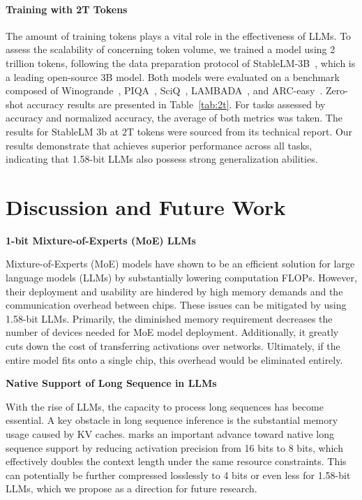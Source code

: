 \paragraph{Training with 2T Tokens}

The amount of training tokens plays a vital role in the effectiveness of LLMs. To assess the scalability of  concerning token volume, we trained a  model using 2 trillion tokens, following the data preparation protocol of StableLM-3B~\cite{StableLM-3B-4E1T}, which is a leading open-source 3B model. Both models were evaluated on a benchmark composed of Winogrande~\cite{winoGrande}, PIQA~\cite{piqa}, SciQ~\cite{sciq}, LAMBADA~\cite{lambada}, and ARC-easy~\cite{arc}. Zero-shot accuracy results are presented in Table~\ref{tab:2t}. For tasks assessed by accuracy and normalized accuracy, the average of both metrics was taken. The results for StableLM 3b at 2T tokens were sourced from its technical report. Our results demonstrate that  achieves superior performance across all tasks, indicating that 1.58-bit LLMs also possess strong generalization abilities.

\section{Discussion and Future Work}

\textbf{1-bit Mixture-of-Experts (MoE) LLMs}

Mixture-of-Experts (MoE) models have shown to be an efficient solution for large language models (LLMs) by substantially lowering computation FLOPs. However, their deployment and usability are hindered by high memory demands and the communication overhead between chips. These issues can be mitigated by using 1.58-bit LLMs. Primarily, the diminished memory requirement decreases the number of devices needed for MoE model deployment. Additionally, it greatly cuts down the cost of transferring activations over networks. Ultimately, if the entire model fits onto a single chip, this overhead would be eliminated entirely.

\textbf{Native Support of Long Sequence in LLMs}

With the rise of LLMs, the capacity to process long sequences has become essential. A key obstacle in long sequence inference is the substantial memory usage caused by KV caches.  marks an important advance toward native long sequence support by reducing activation precision from 16 bits to 8 bits, which effectively doubles the context length under the same resource constraints. This can potentially be further compressed losslessly to 4 bits or even less for 1.58-bit LLMs, which we propose as a direction for future research.

